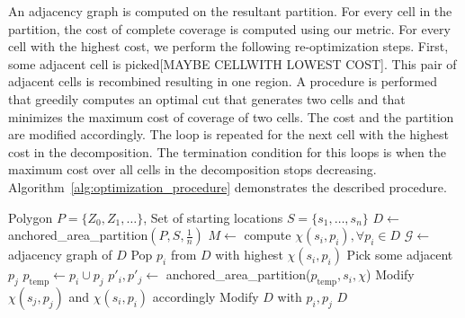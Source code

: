 \documentclass[../main.tex]{subfiles}
\begin{document}
An adjacency graph is computed on the resultant partition. For every cell in the partition, the cost of complete coverage is computed using our metric. For every cell with the highest cost, we perform the following re-optimization steps. First, some adjacent cell is picked[MAYBE CELLWITH LOWEST COST]. This pair of adjacent cells is recombined resulting in one region. A procedure is performed that greedily computes an optimal cut that generates two cells and that minimizes the maximum cost of coverage of two cells. The cost and the partition are modified accordingly. The loop is repeated for the next cell with the highest cost in the decomposition. The termination condition for this loops is when the maximum cost over all cells in the decomposition stops decreasing. Algorithm~\ref{alg:optimization_procedure} demonstrates the described procedure.

\begin{algorithm}
	\caption{$\operatorname{optimization\_procedure}(P, S)$}
	\label{alg:optimization_procedure}
	\begin{algorithmic}[1]
		\REQUIRE Polygon $P=\{Z_0,Z_1,\ldots\}$, Set of starting locations $S=\{s_1,\ldots,s_n\}$
			\STATE $D\gets$ anchored\_area\_partition$(P,S,\frac{1}{n})$ \label{line:area_part}
			\STATE $M\gets$ compute $\chi(s_i,p_i), \forall p_i\in D$ 
			\STATE $\mathcal{G}\gets$ adjacency graph of $D$
			\REPEAT
				\STATE Pop $p_i$ from $D$ with highest $\chi(s_i,p_i)$
				\STATE Pick some adjacent $p_j$
				\STATE $p_{\operatorname{temp}}\gets p_i\cup p_j$
				\STATE $p'_i,p'_j\gets$ anchored\_area\_partition($p_{\text{temp}},s_i,\chi$) \label{line:distr_opt_cut}
				\STATE Modify $\chi(s_j,p_j)$ and $\chi(s_i,p_i)$ accordingly
				\STATE Modify $D$ with $p_i,p_j$
			\RETURN $D$
	\end{algorithmic}
\end{algorithm}
\end{document}
